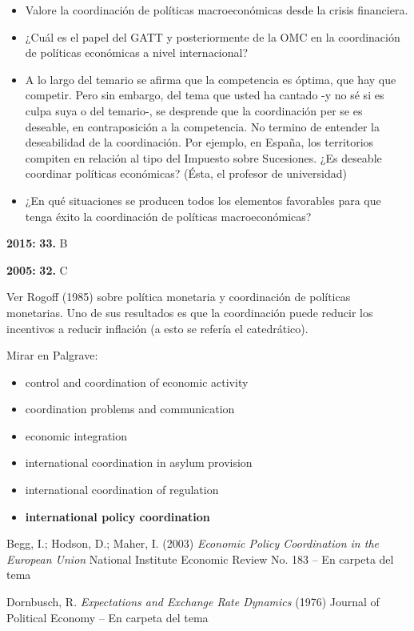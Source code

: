 \documentclass{nuevotema}
\begin{document}
\begin{itemize}
	\item Valore la coordinación de políticas macroeconómicas desde la crisis financiera.
	\item ¿Cuál es el papel del GATT y posteriormente de la OMC en la coordinación de políticas económicas a nivel internacional?
	\item A lo largo del temario se afirma que la competencia es óptima, que hay que competir. Pero sin embargo, del tema que usted ha cantado -y no sé si es culpa suya o del temario-, se desprende que la coordinación per se es deseable, en contraposición a la competencia. No termino de entender la deseabilidad de la coordinación. Por ejemplo, en España, los territorios compiten en relación al tipo del Impuesto sobre Sucesiones. ¿Es deseable coordinar políticas económicas? (Ésta, el profesor de universidad)
	\item ¿En qué situaciones se producen todos los elementos favorables para que tenga éxito la coordinación de políticas macroeconómicas?
\end{itemize}

\notas

\textbf{2015:} \textbf{33.} B

\textbf{2005:} \textbf{32.} C

Ver Rogoff (1985) sobre política monetaria y coordinación de políticas monetarias. Uno de sus resultados es que la coordinación puede reducir los incentivos a reducir inflación (a esto se refería el catedrático).

\bibliografia

Mirar en Palgrave:
\begin{itemize}
	\item control and coordination of economic activity
	\item coordination problems and communication
	\item economic integration
	\item international coordination in asylum provision
	\item international coordination of regulation
	\item \textbf{international policy coordination}
\end{itemize}


Begg, I.; Hodson, D.; Maher, I. (2003) \textit{Economic Policy Coordination in the European Union} National Institute Economic Review No. 183 -- En carpeta del tema


Dornbusch, R. \textit{Expectations and Exchange Rate Dynamics} (1976) Journal of Political Economy -- En carpeta del tema
\end{document}
